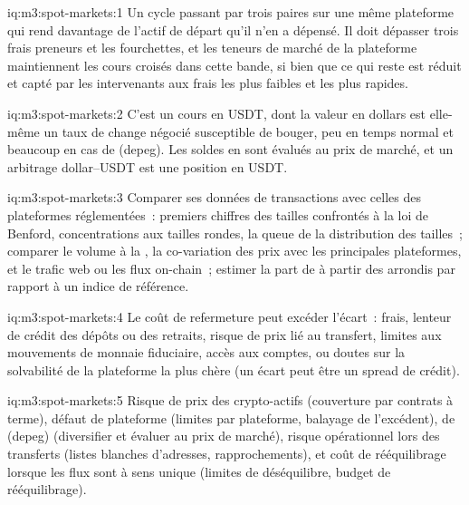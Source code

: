 \begin{solution}{iq:m3:spot-markets:1}
Un cycle passant par trois paires sur une même plateforme qui rend davantage de l'actif de départ qu'il n'en a dépensé. Il doit dépasser trois
frais preneurs et les fourchettes, et les teneurs de marché de la plateforme maintiennent les cours croisés dans cette bande, si bien que ce qui reste est réduit
et capté par les intervenants aux frais les plus faibles et les plus rapides.
\end{solution}

\begin{solution}{iq:m3:spot-markets:2}
C'est un cours en USDT, dont la valeur en dollars est elle-même un taux de change négocié susceptible de bouger, peu en temps normal et beaucoup
en cas de  (depeg). Les soldes en  sont évalués au prix de marché, et un arbitrage dollar--USDT est une position en USDT.
\end{solution}

\begin{solution}{iq:m3:spot-markets:3}
Comparer ses données de transactions avec celles des plateformes réglementées~: premiers chiffres des tailles confrontés à la loi de Benford, concentrations aux
tailles rondes, la queue de la distribution des tailles~; comparer le volume à la , la co-variation des prix avec les principales plateformes,
et le trafic web ou les flux on-chain~; estimer la part de  à partir des arrondis par rapport à un indice de référence.
\end{solution}

\begin{solution}{iq:m3:spot-markets:4}
Le coût de refermeture peut excéder l'écart~: frais, lenteur de crédit des dépôts ou des retraits, risque de prix lié au transfert,
limites aux mouvements de monnaie fiduciaire, accès aux comptes, ou doutes sur la solvabilité de la plateforme la plus chère (un écart peut être un spread de crédit).
\end{solution}

\begin{solution}{iq:m3:spot-markets:5}
Risque de prix des crypto-actifs (couverture par contrats à terme), défaut de plateforme (limites par plateforme, balayage de l'excédent),  de  (depeg)
(diversifier et évaluer au prix de marché), risque opérationnel lors des transferts (listes blanches d'adresses, rapprochements), et coût de rééquilibrage
lorsque les flux sont à sens unique (limites de déséquilibre, budget de rééquilibrage).
\end{solution}

